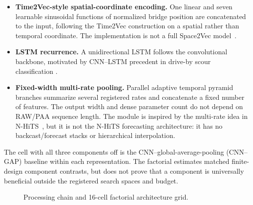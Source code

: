 \begin{itemize}
  \item \textbf{Time2Vec-style spatial-coordinate encoding.} One linear and
  seven learnable sinusoidal functions of normalized bridge position are
  concatenated to the input, following the Time2Vec construction
  \cite{kazemi2019time2vec} on a spatial rather than temporal coordinate. The
  implementation is not a full Space2Vec model~\cite{mai2020space2vec}.
  \item \textbf{LSTM recurrence.} A unidirectional LSTM
  \cite{hochreiter1997long} follows the convolutional backbone, motivated by
  CNN--LSTM precedent in drive-by scour classification
  \cite{fernandes2026canelas}.
  \item \textbf{Fixed-width multi-rate pooling.} Parallel adaptive temporal
  pyramid branches summarize several registered rates and concatenate a fixed
  number of features. The output width and dense parameter count do not depend
  on RAW/PAA sequence length. The module is inspired by the multi-rate idea in
  N-HiTS~\cite{challu2023nhits}, but it is not the N-HiTS forecasting
  architecture: it has no backcast/forecast stacks or hierarchical
  interpolation.
\end{itemize}

The cell with all three components off is the CNN--global-average-pooling
(CNN--GAP) baseline within each representation. The factorial estimates
matched finite-design component contrasts, but does not prove that a component
is universally beneficial outside the registered search spaces and budget.

\begin{figure}[htbp]
\centering
{}
\caption{Processing chain and 16-cell factorial architecture grid.}
\label{fig:architectures}
\end{figure}

